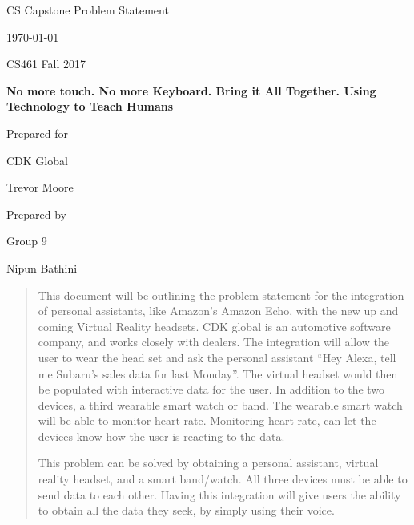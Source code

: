 \documentclass[onecolumn, draftclsnofoot,10pt, compsoc]{IEEEtran}
\def \CapstoneTeamName{			}
\def \CapstoneTeamNumber{		9}
\def \GroupMemberOne{			Nipun Bathini}
\def \GroupMemberTwo{			Carl Benson}
\def \GroupMemberThree{			Brandon Dring}
\def \CapstoneProjectName{		No more touch. No more Keyboard. Bring it All Together. Using Technology to Teach Humans}
\def \CapstoneSponsorCompany{	CDK Global}
\def \CapstoneSponsorPerson{	Trevor Moore}
\def \DocType{		Problem Statement
				}
\newcommand{\NameSigPair}[1]{\par
\makebox[2.75in][r]{#1} \hfil 	\makebox[3.25in]{\makebox[2.25in]{\hrulefill} \hfill		\makebox[.75in]{\hrulefill}}
\par\vspace{-12pt} \textit{\tiny\noindent
\makebox[2.75in]{} \hfil		\makebox[3.25in]{\makebox[2.25in][r]{Signature} \hfill	\makebox[.75in][r]{Date}}}}
\renewcommand{\NameSigPair}[1]{#1}
\begin{document}
\begin{titlepage}
    \begin{singlespace}
        \hfill 
        \par\vspace{.2in}
        \centering
        \scshape{
            \huge CS Capstone \DocType \par
            {\large\today}\par
			{\large CS461 Fall 2017}\par
            \vspace{.5in}
            \textbf{\Huge\CapstoneProjectName}\par
            \vfill
            {\large Prepared for}\par
            \Huge \CapstoneSponsorCompany\par
            \vspace{5pt}
            {\Large\NameSigPair{\CapstoneSponsorPerson}\par}
            {\large Prepared by }\par
            Group\CapstoneTeamNumber\par
            \CapstoneTeamName\par 
            \vspace{5pt}
            {\Large
                \NameSigPair{\GroupMemberOne}\par
            }
            \vspace{20pt}
        }
        \begin{abstract}
			This document will be outlining the problem statement for the integration of personal assistants, like Amazon's Amazon Echo, 
			with the new up and coming Virtual Reality headsets. CDK global is an automotive software company, and works closely with dealers. The integration
			will allow the user to wear the head set and ask the personal assistant ``Hey Alexa, tell me Subaru's sales data for last Monday''. The virtual headset would then 
			be populated with interactive data for the user. In addition to the two devices, a third wearable smart watch or band. The wearable smart watch will be able to
			monitor heart rate. Monitoring heart rate, can let the devices know how the user is reacting to the data.
			
			This problem can be solved by obtaining a personal assistant, virtual reality headset, and a smart band/watch. All three devices must be able to send data to each other.
			Having this integration will give users the ability to obtain all the data they seek, by simply using their voice. 
        \end{abstract}     
    \end{singlespace}
\end{titlepage}
\end{document}
